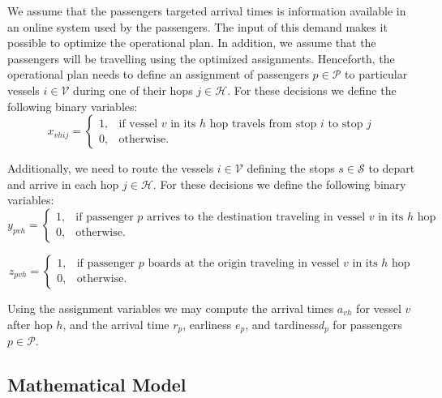 \documentclass[12pt]{elsarticle}
\begin{document}
We assume that the passengers targeted arrival times is information available
in an online system used by the passengers. The input of this demand makes it
possible to optimize the operational plan. In addition, we assume that the
passengers will be travelling using the optimized assignments. Henceforth,
the operational plan needs to define an assignment of passengers $p \in
\mathcal{P}$ to particular vessels $i \in \mathcal{V}$ during one of their
hops $j \in \mathcal{H}$. For these decisions we define the following binary
variables:
\begin{equation}\label{eq:passengerAssignment}
    x_{vhij} = \begin{cases}
                 1, & \mbox{if vessel $v$ in its $h$ hop travels from stop $i$ to stop $j$}\\
                 0, & \mbox{otherwise}.
               \end{cases}
\end{equation}

Additionally, we need to route the vessels $i \in \mathcal{V}$ defining the
stops $s \in \mathcal{S}$ to depart and arrive in each hop $j \in
\mathcal{H}$. For these decisions we define the following binary variables:
\begin{equation}\label{eq:passengerAssignment}
  y_{pvh} = \begin{cases}
    1, & \mbox{if passenger $p$ arrives to the destination traveling in vessel $v$ in its $h$ hop}\\
    0, & \mbox{otherwise}.
  \end{cases}
\end{equation}

\begin{equation}\label{eq:passengerAssignment}
  z_{pvh} = \begin{cases}
    1, & \mbox{if passenger $p$ boards at the origin traveling in vessel $v$ in its $h$ hop}\\
    0, & \mbox{otherwise}.
  \end{cases}
\end{equation}

             

Using the assignment variables we may compute the arrival times $a_{vh}$ for
vessel $v$ after hop $h$, and the arrival time $r_p$, earliness $e_p$, and
tardiness$d_p$ for passengers $p \in \mathcal{P}$.


\subsection{Mathematical Model}
\end{document}
